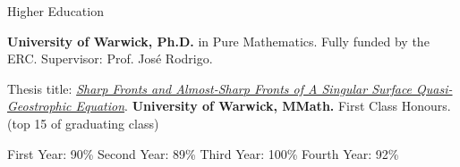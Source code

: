 \begin{rubric}{Higher Education}

	\entry*[\mydaterange{2015}{2019}]%
	\textbf{University of Warwick, Ph.D.}  in Pure Mathematics. Fully funded by the ERC. Supervisor: Prof. Jos\'e Rodrigo. \par Thesis title: \href{http://wrap.warwick.ac.uk/150235}{\emph{Sharp Fronts and Almost-Sharp Fronts of A Singular Surface Quasi-Geostrophic Equation}}.
%
	\entry*[\mydaterange{2011}{2015}]%
	\textbf{University of Warwick, MMath.} First Class Honours. (top 15 of graduating class)
	
	\par
	    First Year: 90\% \hspace{1.7em} Second Year: 89\% \hspace{1.7em}  Third Year: 100\% \hspace{1.7em}  Fourth Year: 92\%
 \end{rubric}
